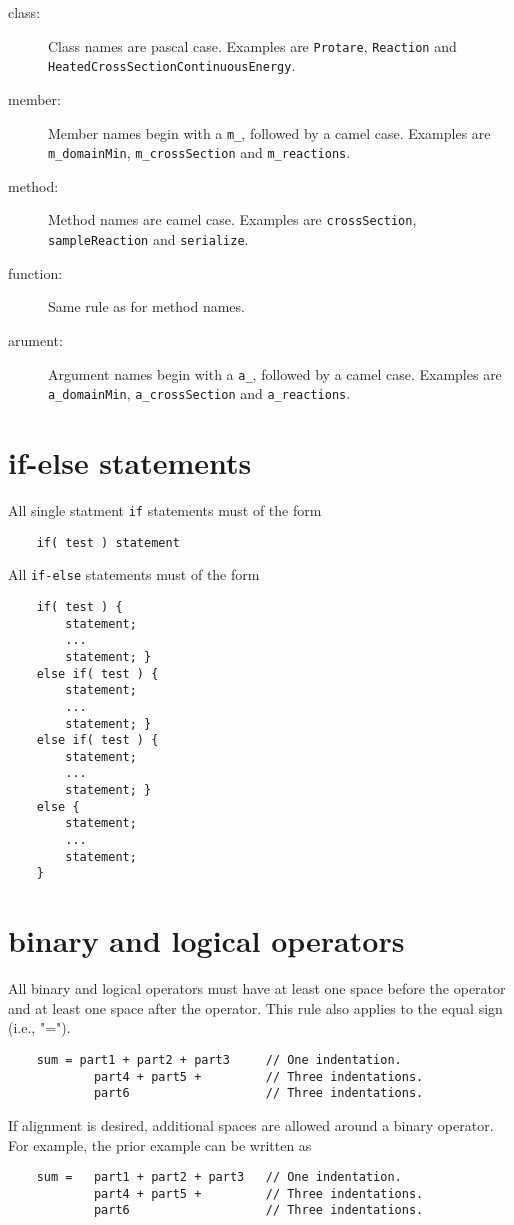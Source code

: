 \documentclass[11pt]{article}
\begin{document}
\begin{description}
    \item[class:] Class names are pascal case. Examples are \texttt{Protare}, \texttt{Reaction} and \texttt{HeatedCrossSectionContinuousEnergy}.
    \item[member:] Member names begin with a \texttt{m\_}, followed by a camel case. Examples are \texttt{m\_domainMin}, 
                    \texttt{m\_crossSection} and \texttt{m\_reactions}.
    \item[method:] Method names are camel case. Examples are \texttt{crossSection}, \texttt{sampleReaction} and \texttt{serialize}.
    \item[function:] Same rule as for method names.
    \item[arument:] Argument names begin with a \texttt{a\_}, followed by a camel case. Examples are \texttt{a\_domainMin},
                    \texttt{a\_crossSection} and \texttt{a\_reactions}.
\end{description}

\section{if-else statements}
All single statment \texttt{if} statements must of the form
\begin{verbatim}
    if( test ) statement
\end{verbatim}

All \texttt{if-else} statements must of the form
\begin{verbatim}
    if( test ) {
        statement;
        ...
        statement; }
    else if( test ) {
        statement;
        ...
        statement; }
    else if( test ) {
        statement;
        ...
        statement; }
    else {
        statement;
        ...
        statement;
    }

\end{verbatim}

\section{binary and logical operators}
All binary and logical operators must have at least one space before the operator and at least one space after the operator. 
This rule also applies to the equal sign (i.e., "=").

\begin{verbatim}
    sum = part1 + part2 + part3     // One indentation.
            part4 + part5 +         // Three indentations.
            part6                   // Three indentations.
\end{verbatim}
If alignment is desired, additional spaces are allowed around a binary operator. For example, the prior example can be written as
\begin{verbatim}
    sum =   part1 + part2 + part3   // One indentation.
            part4 + part5 +         // Three indentations.
            part6                   // Three indentations.
\end{verbatim}
\end{document}
